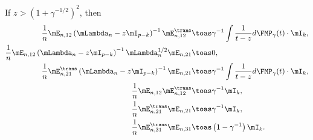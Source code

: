 \begin{lemma}\label{L:eij-product-limits}
    If $z > \left(1 + \gamma^{-1/2} \right)^2$, then
    \begin{align*}
        \frac{1}{n}
        \mE_{n,12}
        \left(
            \mLambda_n
            -
            z \mI_{p-k}
        \right)^{-1}
        \mE_{n,12}^\trans
            &\toas
                \gamma^{-1}
                \int
                    \frac{1}{t - z} d\FMP_\gamma(t)
                \cdot
                \mI_k, \\
        \frac{1}{n}
        \mE_{n,12}
        \left(
            \mLambda_n
            -
            z \mI_{p-k}
        \right)^{-1}
        \mLambda_n^{1/2}
        \mE_{n,21}
            &\toas
                0, \\
        \frac{1}{n}
        \mE_{n,21}^\trans
        \left(
            \mLambda_n
            -
            z \mI_{p-k}
        \right)^{-1}
        \mE_{n,21}
            &\toas
                \gamma^{-1}
                \int
                    \frac{1}{t - z} d\FMP_\gamma(t)
                \cdot
                \mI_k, \\
        \frac{1}{n}
        \mE_{n,12} \mE_{n,12}^\trans
            &\toas
            \gamma^{-1}
            \mI_k, \\
        \frac{1}{n}
        \mE_{n,21}^\trans \mE_{n,21}
            &\toas
                \gamma^{-1}
                \mI_k, \\
        \frac{1}{n}
        \mE_{n,31}^\trans \mE_{n,31}
            &\toas
                \left( 1 - \gamma^{-1} \right)
                \mI_k.
    \end{align*}
\end{lemma}
